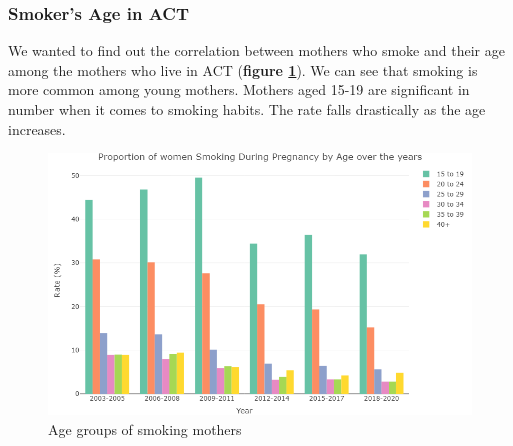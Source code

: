 \subsubsection{Smoker's Age in ACT}
We wanted to find out the correlation between mothers who smoke and their age among the mothers who live in ACT (\textbf{figure \ref{fig:smoking_age}}). We can see that smoking is more common among young mothers. Mothers aged 15-19 are significant in number when it comes to smoking habits. The rate falls drastically as the age increases.
\begin{figure}
  \centering
  \includegraphics[width=1\textwidth]{subsections/smoking/smoking.png}
  \caption{Age groups of smoking mothers}
  \label{fig:smoking_age}
\end{figure}